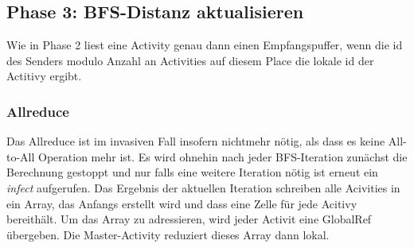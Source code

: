 \subsection{Phase 3: BFS-Distanz aktualisieren} %
\label{sub:phase_3_invasive}
Wie in Phase 2 liest eine Activity genau dann einen Empfangspuffer, wenn die id des Senders modulo Anzahl an Activities auf diesem Place die lokale id der Actitivy ergibt. 

\subsubsection{Allreduce} %
\label{ssub:allreduce_invasive}
Das Allreduce ist im invasiven Fall insofern nichtmehr nötig, als dass es keine All-to-All Operation mehr ist. Es wird ohnehin nach jeder BFS-Iteration zunächst die Berechnung gestoppt und nur falls eine weitere Iteration nötig ist erneut ein \textit{infect} aufgerufen. Das Ergebnis der aktuellen Iteration schreiben alle Acivities in ein Array, das Anfangs erstellt wird und dass eine Zelle für jede Acitivy bereithält. Um das Array zu adressieren, wird jeder Activit eine GlobalRef übergeben. Die Master-Activity reduziert dieses Array dann lokal.


